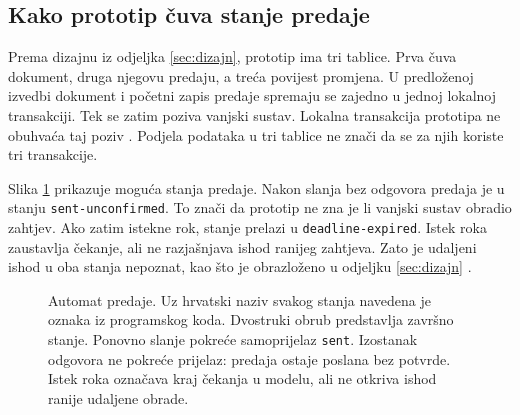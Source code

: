 \subsection{Kako prototip čuva stanje predaje}
\label{sec:komponente}

Prema dizajnu iz odjeljka \ref{sec:dizajn}, prototip ima tri tablice. Prva
čuva dokument, druga njegovu predaju, a treća povijest promjena. U
predloženoj izvedbi dokument i početni zapis predaje spremaju se zajedno u
jednoj lokalnoj transakciji. Tek se zatim poziva vanjski sustav. Lokalna
transakcija prototipa ne obuhvaća taj poziv
\cite{helland2007lifebeyond}. Podjela podataka u tri tablice ne znači da se
za njih koriste tri transakcije.

Slika \ref{fig:automat} prikazuje moguća stanja predaje. Nakon slanja bez
odgovora predaja je u stanju \texttt{sent-unconfirmed}. To znači da
prototip ne zna je li vanjski sustav obradio zahtjev. Ako zatim istekne rok,
stanje prelazi u \texttt{deadline-expired}. Istek roka zaustavlja čekanje,
ali ne razjašnjava ishod ranijeg zahtjeva. Zato je udaljeni ishod u oba
stanja nepoznat, kao što je obrazloženo u odjeljku \ref{sec:dizajn}
\cite{schneider1990statemachine}.

\begin{figure}[htbp]
\centering
{}
\caption[Automat predaje dokumenta]{Automat predaje. Uz hrvatski naziv
svakog stanja navedena je oznaka iz programskog koda. Dvostruki obrub
predstavlja završno stanje. Ponovno slanje pokreće samoprijelaz
\texttt{sent}. Izostanak odgovora ne pokreće prijelaz: predaja ostaje
poslana bez potvrde. Istek roka označava kraj čekanja u modelu, ali ne
otkriva ishod ranije udaljene obrade.}
\label{fig:automat}
\end{figure}

